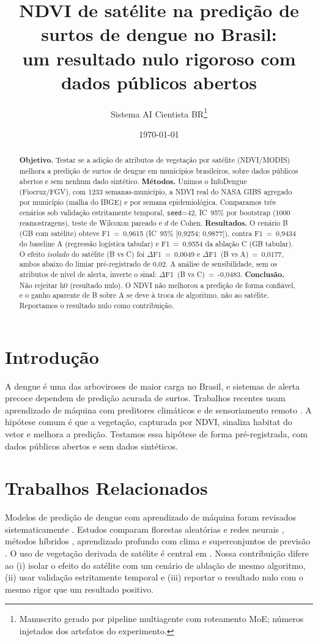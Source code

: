 \documentclass[12pt,a4paper]{article}
\title{NDVI de satélite na predição de surtos de dengue no Brasil:\\
um resultado nulo rigoroso com dados públicos abertos}
\author{Sistema AI Cientista BR\thanks{Manuscrito gerado por pipeline multiagente
com roteamento MoE; números injetados dos artefatos do experimento.}}
\date{\today}
\begin{document}
\maketitle

\begin{abstract}
\textbf{Objetivo.} Testar se a adição de atributos de vegetação por satélite
(NDVI/MODIS) melhora a predição de surtos de dengue em municípios brasileiros,
sobre dados públicos abertos e sem nenhum dado sintético.
\textbf{Métodos.} Unimos o InfoDengue (Fiocruz/FGV), com 1233 semanas-município,
a NDVI real do NASA GIBS agregado por município (malha do IBGE) e por semana
epidemiológica. Comparamos três cenários sob validação estritamente temporal,
\texttt{seed}=42, IC~95\% por bootstrap (1000 reamostragens), teste de Wilcoxon
pareado e $d$ de Cohen.
\textbf{Resultados.} O cenário B (GB com satélite) obteve F1~=~0,9615
(IC~95\% [0,9254; 0,9877]), contra
F1~=~0,9434 do baseline A (regressão logística tabular) e
F1~=~0,9554 da ablação C (GB tabular). O efeito \emph{isolado} do satélite
(B vs C) foi $\Delta$F1~=~0,0049 e
$\Delta$F1~(B vs A)~=~0,0177, ambos abaixo do limiar
pré-registrado de 0,02. A análise de sensibilidade, sem os
atributos de nível de alerta, inverte o sinal: $\Delta$F1~(B vs C)~=~-0,0483.
\textbf{Conclusão.} Não rejeitar h0 (resultado nulo). O NDVI não melhorou a predição de
forma confiável, e o ganho aparente de B sobre A se deve à troca de algoritmo,
não ao satélite. Reportamos o resultado nulo como contribuição.
\end{abstract}

\section{Introdução}
A dengue é uma das arboviroses de maior carga no Brasil, e sistemas de alerta
precoce dependem de predição acurada de surtos. Trabalhos recentes usam
aprendizado de máquina com preditores climáticos e de sensoriamento remoto
\cite{10.1371/journal.pntd.0005973}\cite{10.1073/pnas.1909865116}\cite{10.1371/journal.pntd.0008056}. A hipótese comum é que a vegetação, capturada por
NDVI, sinaliza habitat do vetor e melhora a predição. Testamos essa hipótese de
forma pré-registrada, com dados públicos abertos e sem dados sintéticos.

\section{Trabalhos Relacionados}
Modelos de predição de dengue com aprendizado de máquina foram revisados
sistematicamente \cite{10.1038/srep33707}\cite{10.1016/j.physa.2019.121266}. Estudos comparam florestas aleatórias e redes
neurais \cite{10.1371/journal.pntd.0005729}, métodos híbridos \cite{10.1371/journal.pntd.0010509}, aprendizado profundo com clima
\cite{10.3390/ijerph17020453}\cite{10.1098/rsif.2016.0410} e superconjuntos de previsão \cite{10.1016/j.sste.2020.100372}. O uso de vegetação
derivada de satélite é central em \cite{10.1038/s41598-020-79193-2}\cite{10.1186/s12879-019-3874-x}. Nossa contribuição difere
ao (i) isolar o efeito do satélite com um cenário de ablação de mesmo algoritmo,
(ii) usar validação estritamente temporal e (iii) reportar o resultado nulo com
o mesmo rigor que um resultado positivo.
\end{document}
